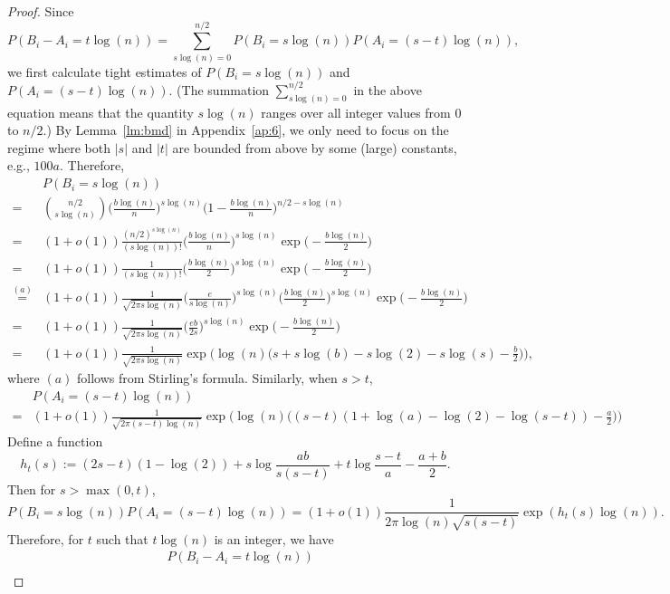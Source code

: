 \documentclass{article}
\begin{document}
\begin{proof}
Since
$$
P(B_i-A_i = t\log(n))
= \sum_{s\log(n)=0}^{n/2}
P(B_i = s\log(n)) P(A_i=(s-t)\log(n)) ,
$$
we first calculate tight estimates of $P(B_i = s\log(n))$ and $P(A_i=(s-t)\log(n))$. (The summation $\sum_{s\log(n)=0}^{n/2}$ in the above equation means that the quantity $s\log(n)$ ranges over all integer values from $0$ to $n/2$.)
By Lemma~\ref{lm:bmd} in Appendix~\ref{ap:6}, we only need to focus on the regime where both $|s|$ and $|t|$ are bounded from above by some (large) constants, e.g., $100a$.
Therefore,
\begin{align*}
& P(B_i = s\log(n)) \\
= & \binom{n/2}{s\log(n)}
\Big( \frac{b\log(n)}{n} \Big)^{s\log(n)}
\Big( 1- \frac{b\log(n)}{n} \Big)^{n/2-s\log(n)}  \\
= & (1+o(1))
\frac{(n/2)^{s\log(n)}}{(s\log(n))!} \Big( \frac{b\log(n)}{n} \Big)^{s\log(n)}
\exp \Big(-\frac{b\log(n)}{2} \Big)  \\
= & (1+o(1))
\frac{1} {(s\log(n))!} \Big( \frac{b\log(n)}{2} \Big)^{s\log(n)}
\exp \Big(-\frac{b\log(n)}{2} \Big)  \\
\overset{(a)}{=} & (1+o(1))
\frac{1} {\sqrt{2\pi s\log(n)}}
\Big(\frac{e}{s\log(n)} \Big)^{s\log(n)}
\Big( \frac{b\log(n)}{2} \Big)^{s\log(n)}
\exp \Big(-\frac{b\log(n)}{2} \Big)  \\
= & (1+o(1))
\frac{1} {\sqrt{2\pi s\log(n)}}
\Big( \frac{ e b }{2s} \Big)^{s\log(n)}
\exp \Big(-\frac{b\log(n)}{2} \Big) \\
= & (1+o(1))
\frac{1} {\sqrt{2\pi s\log(n)}}
\exp\Big( \log(n) \Big( 
s+ s\log(b)-s\log(2)-s\log(s)-\frac{b}{2}
\Big)\Big) ,
\end{align*}
where $(a)$ follows from Stirling's formula.
Similarly, when $s > t$,
\begin{align*}
& P(A_i=(s-t)\log(n)) \\
= & (1+o(1))
\frac{1} {\sqrt{2\pi (s-t)\log(n)}}
\exp\Big( \log(n) \Big( 
 (s-t)(1+\log(a)-\log(2)-\log(s-t))-\frac{a}{2}
\Big)\Big)
\end{align*}
Define a function
$$
h_t(s):=(2s-t)(1-\log(2))
+s\log\frac{ab}{s(s-t)}
+t\log\frac{s-t}{a} -\frac{a+b}{2} .
$$
Then for $s>\max(0,t)$,
$$
P(B_i = s\log(n)) P(A_i=(s-t)\log(n))
= (1+o(1)) \frac{1} {2\pi \log(n)\sqrt{s (s-t)}}
\exp(h_t(s) \log(n)) .
$$
Therefore, for $t$ such that $t\log(n)$ is an integer, we have
\begin{equation} \label{eq:gj}
\begin{aligned}
& P(B_i-A_i = t\log(n))  \\

\end{aligned}
\end{equation}
\end{proof}
\end{document}

